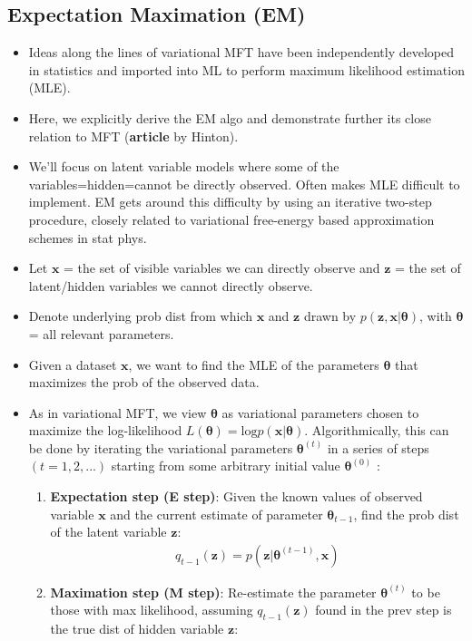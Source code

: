 \documentclass[norsk,a4paper,11pt]{article}
\begin{document}
\subsection{Expectation Maximation (EM)}
\begin{itemize}
	\item Ideas along the lines of variational MFT have been independently developed in statistics and imported into ML to perform maximum likelihood estimation (MLE).
	\item Here, we explicitly derive the EM algo and demonstrate further its close relation to MFT (\textbf{article} by Hinton).
	\item We'll focus on latent variable models where some of the variables=hidden=cannot be directly observed. Often makes MLE difficult to implement. EM gets around this difficulty by using an iterative two-step procedure, closely related to variational free-energy based approximation schemes in stat phys.
	\item Let $\bm{x}$ = the set of visible variables we can directly observe and $\bm{z}$ = the set of latent/hidden variables we cannot directly observe.
	\item Denote underlying prob dist from which $\bm{x}$ and $\bm{z}$ drawn by $p(\bm{z}, \bm{x}| \bm{\theta})$, with $\bm{\theta}$ = all relevant parameters.
	\item Given a dataset $\bm{x}$, we want to find the MLE of the parameters $\bm{\theta}$ that maximizes the prob of the observed data.
	\item As in variational MFT, we view $\bm{\theta}$ as variational parameters chosen to maximize the log-likelihood $L(\bm{\theta}) = \text{log} p(\bm{x}|\bm{\theta})$. Algorithmically, this can be done by iterating the variational parameters $\bm{\theta}^{(t)}$ in a series of steps $(t=1,2,...)$ starting from some arbitrary initial value $\bm{\theta}^{(0)}$ :
	\begin{enumerate}
		\item \textbf{Expectation step (E step)}:
		Given the known values of observed variable $\bm{x}$ and the current estimate of parameter $\bm{\theta}_{t-1}$, find the prob dist of the latent variable $\bm{z}$:
		\begin{align}
			q_{t-1} (\bm{z}) = p(\bm{z}| \bm{\theta}^{(t-1)}, \bm{x})
		\end{align}
		\item \textbf{Maximation step (M step)}:
		Re-estimate the parameter $\bm{\theta}^{(t)}$ to be those with max likelihood, assuming $q_{t-1} (\bm{z})$ found in the prev step is the true dist of hidden variable $\bm{z}$:

\end{enumerate}
\end{itemize}
\end{document}
